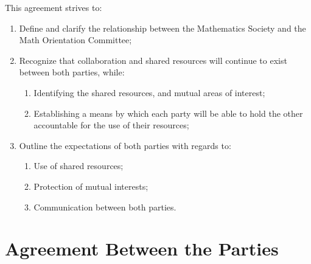 \documentclass[12pt, letterpaper]{article}
\begin{document}
This agreement strives to:
\begin{enumerate}
    \item Define and clarify the relationship between the Mathematics Society and the Math Orientation Committee;
    \item Recognize that collaboration and shared resources will continue to exist between both parties, while:
    \begin{enumerate}
        \item Identifying the shared resources, and mutual areas of interest;
        \item Establishing a means by which each party will be able to hold the other accountable for the use of their resources;
    \end{enumerate}
    \item Outline the expectations of both parties with regards to:
    \begin{enumerate}
        \item Use of shared resources;
        \item Protection of mutual interests;
        \item Communication between both parties.
    \end{enumerate}
\end{enumerate}

\section{Agreement Between the Parties}
\end{document}
